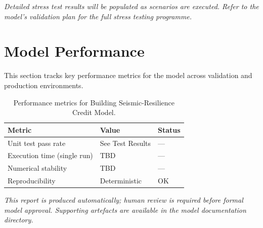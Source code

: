 \documentclass[11pt,a4paper]{article}
\begin{document}
\textit{Detailed stress test results will be populated as scenarios are executed.
Refer to the model's validation plan for the full stress testing programme.}

\section{Model Performance}

This section tracks key performance metrics for the model across
validation and production environments.

\begin{table}[H]
    \centering
    \caption{Performance metrics for Building Seismic-Resilience Credit Model.}
    \begin{tabular}{lll}
        \toprule
        \textbf{Metric} & \textbf{Value} & \textbf{Status} \\
        \midrule
        Unit test pass rate & See Test Results & --- \\
        Execution time (single run) & TBD & --- \\
        Numerical stability & TBD & --- \\
        Reproducibility & Deterministic & OK \\
        \bottomrule
    \end{tabular}
\end{table}

\vspace{12pt}

\noindent\textit{\small This report is produced automatically; human review
is required before formal model approval. Supporting artefacts are available
in the model documentation directory.}
\end{document}
